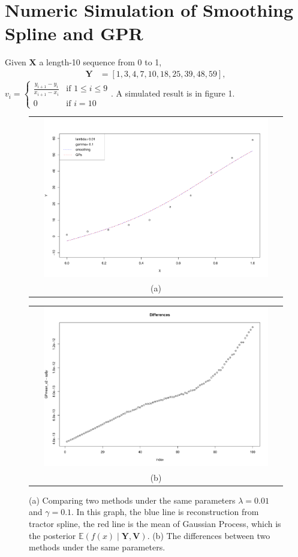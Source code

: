 \section{Numeric Simulation of Smoothing Spline and GPR}
Given $\mathbf{X}$ a length-10 sequence from 0 to 1, 
\begin{align*}
\mathbf{Y}&=\left[1,3,4,7,10,18,25,39,48,59 \right],
\end{align*}
$v_i=\begin{cases}
\frac{y_{i+1}-y_i}{x_{i+1}-x_i}&\mbox{if } 1\leq i \leq 9\\
0 & \mbox{if } i=10
\end{cases}$. 
A simulated result is in figure 1.
\begin{figure}[!htb]  
	\centering
	\begin{tabular}{c}
		\includegraphics[width=12cm,height=7cm]{Chapters/03GPR/plot/simu01} \\[\abovecaptionskip]
		\small (a) 
	\end{tabular}
	\begin{tabular}{c}
		\includegraphics[width=12cm,height=7cm]{Chapters/03GPR/plot/simu02} \\[\abovecaptionskip]
		\small (b) 
	\end{tabular}
	\caption{(a) Comparing two methods under the same parameters $\lambda=0.01$ and $\gamma=0.1$. In this graph, the blue line is reconstruction from tractor spline, the red line is the mean of Gaussian Process, which is the posterior $\mathbb{E}(f(x) \mid  \mathbf{Y}, \mathbf{V})$. (b) The differences between two methods under the same parameters.}
\end{figure}



